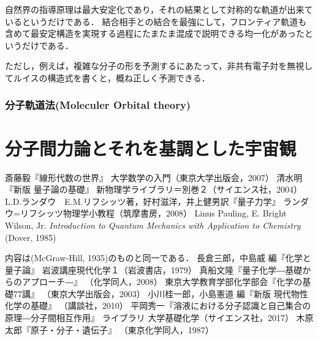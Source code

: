\documentclass[uplatex, 12pt, dvipdfmx]{jsreport}
\begin{document}
自然界の指導原理は最大安定化であり，それの結果として対称的な軌道が出来ているというだけである．
結合相手との結合を最強にして，フロンティア軌道も含めて最安定構造を実現する過程にたまたま混成で説明できる均一化があったというだけである．

ただし，例えば，複雑な分子の形を予測するにあたって，非共有電子対を無視してルイスの構造式を書くと，概ね正しく予測できる．

\section{分子軌道法(Moleculer Orbital theory)}

\part{分子間力論とそれを基調とした宇宙観}

\begin{thebibliography}{99}
        斎藤毅『線形代数の世界』
        大学数学の入門（東京大学出版会，2007）
        清水明『新版 量子論の基礎』
        新物理学ライブラリ＝別巻２（サイエンス社，2004）
        L.D.ランダウ　E.M.リフシッツ著，好村滋洋，井上健男訳『量子力学』
        ランダウ=リフシッツ物理学小教程（筑摩書房，2008）
        Linus Pauling, E. Bright Wilson, Jr. \textit{Introduction to Quantum Mechanics with Application to Chemistry}
        (Dover, 1985)
        
        内容は(McGraw-Hill, 1935)のものと同一である．
        長倉三郎，中島威 編『化学と量子論』
        岩波講座現代化学１（岩波書店，1979）
        真船文隆『量子化学―基礎からのアプローチ―』
        （化学同人，2008）
        東京大学教育学部化学部会『化学の基礎77講』
        （東京大学出版会，2003）
        小川桂一郎，小島憲道 編『新版 現代物性化学の基礎』
        （講談社，2010）
        平岡秀一『溶液における分子認識と自己集合の原理―分子間相互作用』
        ライブラリ 大学基礎化学（サイエンス社，2017）
        木原太郎『原子・分子・遺伝子』
        （東京化学同人，1987）
\end{thebibliography}
\end{document}
